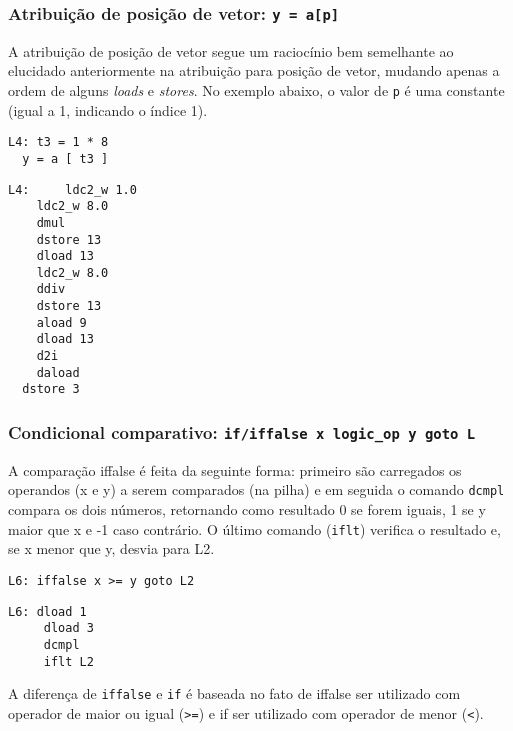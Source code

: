 \subsubsection{Atribuição de posição de vetor: \texttt{y = a[p]} }

A atribuição de posição de vetor segue um raciocínio bem semelhante ao elucidado anteriormente na atribuição para posição de vetor, mudando apenas a ordem de alguns \textit{loads} e \textit{stores}. No exemplo abaixo, o valor de \texttt{p} é uma constante (igual a 1, indicando o índice 1).


\begin{lstlisting}[caption=Atribuição de variável utilizando valor na posição de vetor em código intermediário.]
L4:	t3 = 1 * 8
  y = a [ t3 ]
\end{lstlisting}

\begin{lstlisting}[caption=Atribuição de variável utilizando valor na posição de vetor em Jasmin.]
L4: 	ldc2_w 1.0
    ldc2_w 8.0
    dmul
    dstore 13
    dload 13
    ldc2_w 8.0
    ddiv
    dstore 13
    aload 9
    dload 13
    d2i
    daload
  dstore 3
\end{lstlisting}


\subsubsection{Condicional comparativo: \texttt{if/iffalse x logic\_op y goto L} }

A comparação iffalse é feita da seguinte forma: primeiro são carregados os operandos (x e y) a serem comparados (na pilha) e em seguida o comando \texttt{dcmpl} compara os dois números, retornando como resultado 0 se forem iguais, 1 se y maior que x e -1 caso contrário. O último comando (\texttt{iflt}) verifica o resultado e, se x menor que y, desvia para L2.

\begin{lstlisting}[caption=iffalse com comparação em código intermediário]
L6:	iffalse x >= y goto L2
\end{lstlisting}

\begin{lstlisting}[caption=iffalse com comparação em Jasmin]
L6: dload 1
     dload 3
     dcmpl
     iflt L2
\end{lstlisting}

A diferença de \texttt{iffalse} e \texttt{if} é baseada no fato de iffalse ser utilizado com operador de maior ou igual (\texttt{>=}) e if ser utilizado com operador de menor (\texttt{<}).

